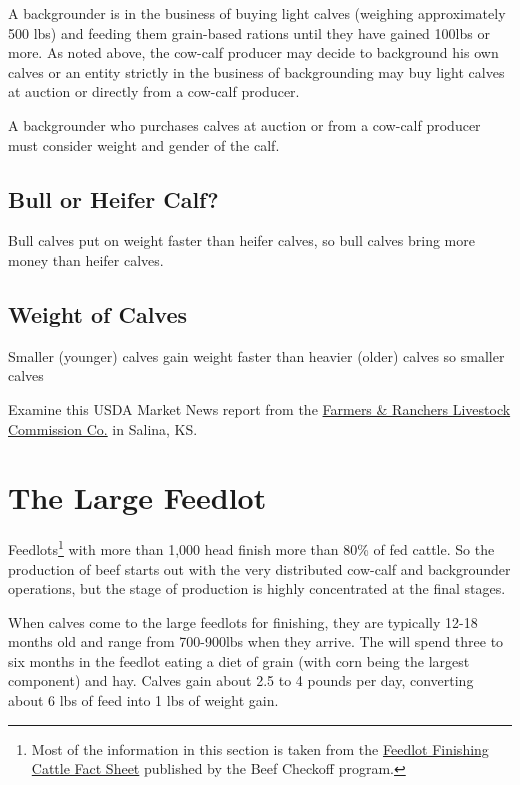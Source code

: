 \documentclass[
  letterpaper,
  DIV=11,
  numbers=noendperiod]{scrreprt}
\begin{document}
A backgrounder is in the business of buying light calves (weighing
approximately 500 lbs) and feeding them grain-based rations until they
have gained 100lbs or more. As noted above, the cow-calf producer may
decide to background his own calves or an entity strictly in the
business of backgrounding may buy light calves at auction or directly
from a cow-calf producer.

A backgrounder who purchases calves at auction or from a cow-calf
producer must consider weight and gender of the calf.

\hypertarget{bull-or-heifer-calf}{%
\subsection{Bull or Heifer Calf?}\label{bull-or-heifer-calf}}

Bull calves put on weight faster than heifer calves, so bull calves
bring more money than heifer calves.

\hypertarget{weight-of-calves}{%
\subsection{Weight of Calves}\label{weight-of-calves}}

Smaller (younger) calves gain weight faster than heavier (older) calves
so smaller calves

Examine this USDA Market News report from the
\href{http://www.ams.usda.gov/mnreports/dc_ls143.txt}{Farmers \&
Ranchers Livestock Commission Co.} in Salina, KS.

\hypertarget{the-large-feedlot}{%
\section{The Large Feedlot}\label{the-large-feedlot}}

Feedlots\footnote{Most of the information in this section is taken from
  the
  \href{http://www.beefusa.org/uDocs/Feedlot\%20finishing\%20fact\%20sheet\%20FINAL_4\%2026\%2006.pdf}{Feedlot
  Finishing Cattle Fact Sheet} published by the Beef Checkoff program.}
with more than 1,000 head finish more than 80\% of fed cattle. So the
production of beef starts out with the very distributed cow-calf and
backgrounder operations, but the stage of production is highly
concentrated at the final stages.

When calves come to the large feedlots for finishing, they are typically
12-18 months old and range from 700-900lbs when they arrive. The will
spend three to six months in the feedlot eating a diet of grain (with
corn being the largest component) and hay. Calves gain about 2.5 to 4
pounds per day, converting about 6 lbs of feed into 1 lbs of weight
gain.
\end{document}
